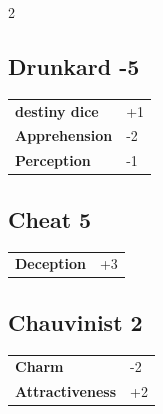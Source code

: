 \begin{multicols}{2}
\begin{tcolorbox}
    \subsection*{Drunkard \hfill \small{-5 }}
    \tcblower




\begin{tabular}{@{}ll@{}}
    \textbf{destiny dice} & +1\\
    \textbf{Apprehension} & -2\\
    \textbf{Perception} & -1\\
\end{tabular}


\end{tcolorbox}

\begin{tcolorbox}
    \subsection*{Cheat \hfill \small{5 }}
    \tcblower




\begin{tabular}{@{}ll@{}}
    \textbf{Deception} & +3\\
\end{tabular}


\end{tcolorbox}

\begin{tcolorbox}
    \subsection*{Chauvinist \hfill \small{2 }}
    \tcblower




\begin{tabular}{@{}ll@{}}
    \textbf{Charm} & -2\\
    \textbf{Attractiveness} & +2\\
\end{tabular}


\end{tcolorbox}
\end{multicols}
